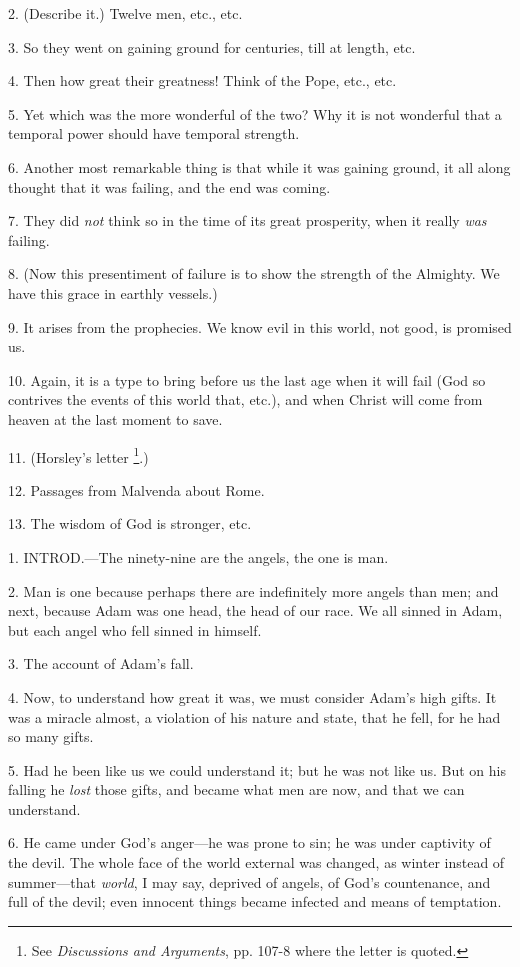 2. (Describe it.) Twelve men, etc., etc.

3. So they went on gaining ground for centuries,
till at length, etc.

4. Then how great their greatness! Think of the
Pope, etc., etc.

5. Yet which was the more wonderful of the two?
Why it is not wonderful that a temporal power should have temporal
strength.

6. Another most remarkable thing is that while it
was gaining ground, it all along thought that it was failing, and the
end was coming.

7. They did \emph{not} think so in the time of
its great prosperity, when it really \emph{was} failing.

8. (Now this presentiment of failure is to show
the strength of the Almighty. We have this grace in earthly
vessels.)

9. It arises from the prophecies. We know evil in
this world, not good, is promised us.

10. Again, it is a type to bring before us the
last age when it will fail (God so contrives the events of this world
that, etc.), and when Christ will come from heaven at the last moment
to save.

11. (Horsley's letter \footnote{See \emph{Discussions and
Arguments}, pp. 107-8 where the letter is quoted.}.)

12. Passages from Malvenda about Rome.

13. The wisdom of God is stronger, etc.


1. INTROD.—The
ninety-nine are the angels, the one is man.

2. Man is one because perhaps there are
indefinitely more angels than men; and next, because Adam was one
head, the head of our race. We all sinned in Adam, but each angel who
fell sinned in himself.

3. The account of Adam's fall.

4. Now, to understand how great it was, we must
consider Adam's high gifts. It was a miracle almost, a violation of
his nature and state, that he fell, for he had so many gifts.

5. Had he been like us we could understand it;
but he was not like us. But on his falling he \emph{lost} those gifts,
and became what men are now, and that we can understand.

6. He came under God's anger—he was prone to
sin; he was under captivity of the devil. The whole face of the world
external was changed, as winter instead of summer—that \emph{world},
I may say, deprived of angels, of God's countenance, and full of the
devil; even innocent things became infected and means of temptation.

